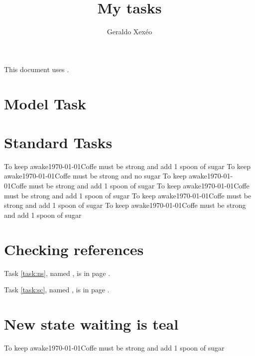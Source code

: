 \documentclass[12pt,a4paper]{article}
\author{Geraldo Xexéo}
\title{My tasks}
\begin{document}
\maketitle

This document uses \printtaskreportversion.

\section{Model Task}

\section{Standard Tasks}
%
{To keep awake}{\today}{Coffe must be strong and add 1 spoon of sugar}
%
{To keep awake}{\today}{Coffe must be strong and no sugar\label{task:ns}}
%
{To keep awake}{\today}{Coffe must be strong and add 1 spoon of sugar}
%
{To keep awake}{\today}{Coffe must be strong and add 1 spoon of sugar}
%
{To keep awake}{\today}{Coffe must be strong and add 1 spoon of sugar}
%
{To keep awake}{\today}{Coffe must be strong and add 1 spoon of sugar\label{task:sc}}

\section{Checking references}

Task \ref{task:ns}, named , is in page \pageref{task:ns}.

Task \ref{task:sc}, named , is in page \pageref{task:sc}.

\section{New state waiting is teal}

%
{To keep awake}{\today}{Coffe must be strong and add 1 spoon of sugar}
\end{document}
